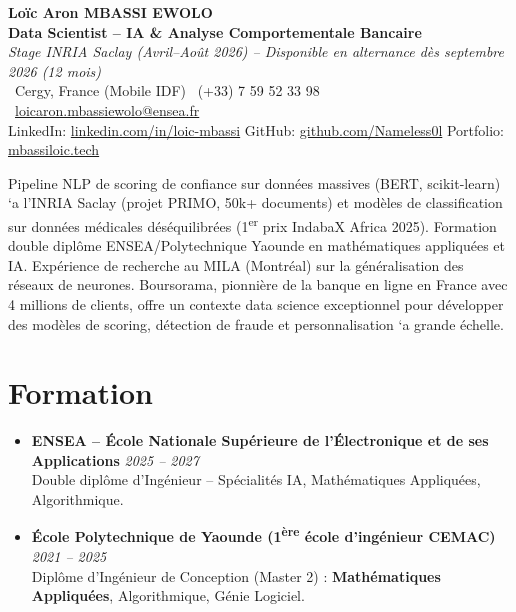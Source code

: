 \documentclass[a4paper,11pt]{article}
\begin{document}
\begin{center}
    {\Large \textbf{Lo\"ic Aron MBASSI EWOLO}} \\ \vspace{4pt}
    \textbf{\large Data Scientist -- IA \& Analyse Comportementale Bancaire} \\
    \textit{\small Stage INRIA Saclay (Avril--Ao\^ut 2026) -- Disponible en alternance d\`es septembre 2026 (12 mois)} \\ \vspace{4pt}
    \small
    \Pointinghand\ Cergy, France (Mobile IDF) \quad \Mobilefone\ (+33) 7 59 52 33 98 \quad
    {\color{primary}\Letter\ \href{mailto:loicaron.mbassiewolo@ensea.fr}{loicaron.mbassiewolo@ensea.fr}} \\ \vspace{2pt}
    {\color{primary}LinkedIn: \href{https://www.linkedin.com/in/loic-mbassi/}{linkedin.com/in/loic-mbassi}} \quad
    {\color{primary}GitHub: \href{https://github.com/Nameless0l}{github.com/Nameless0l}} \quad
    {\color{primary}Portfolio: \href{https://mbassiloic.tech}{mbassiloic.tech}}
\end{center}
\vspace{-6pt}
\noindent\small{Pipeline NLP de scoring de confiance sur donn\'ees massives (BERT, scikit-learn) `a l'INRIA Saclay (projet PRIMO, 50k+ documents) et mod\`eles de classification sur donn\'ees m\'edicales d\'es\'equilibr\'ees (1\textsuperscript{er} prix IndabaX Africa 2025). Formation double dipl\^ome ENSEA/Polytechnique Yaounde en math\'ematiques appliqu\'ees et IA. Exp\'erience de recherche au MILA (Montr\'eal) sur la g\'en\'eralisation des r\'eseaux de neurones. Boursorama, pionnière de la banque en ligne en France avec 4 millions de clients, offre un contexte data science exceptionnel pour d\'evelopper des mod\`eles de scoring, d\'etection de fraude et personnalisation `a grande \'echelle.}

\section{Formation}
\begin{itemize}[leftmargin=*, label=\tiny$\bullet$, nosep]
    \item \textbf{ENSEA -- \'Ecole Nationale Sup\'erieure de l'\'Electronique et de ses Applications} \hfill \textit{2025 -- 2027} \\
    \small{Double dipl\^ome d'Ing\'enieur -- Sp\'ecialit\'es IA, Math\'ematiques Appliqu\'ees, Algorithmique.}
    \item \textbf{\'Ecole Polytechnique de Yaounde (1\textsuperscript{\`ere} \'ecole d'ing\'enieur CEMAC)} \hfill \textit{2021 -- 2025} \\
    \small{Dipl\^ome d'Ing\'enieur de Conception (Master 2) : \textbf{Math\'ematiques Appliqu\'ees}, Algorithmique, G\'enie Logiciel.}
\end{itemize}
\end{document}

